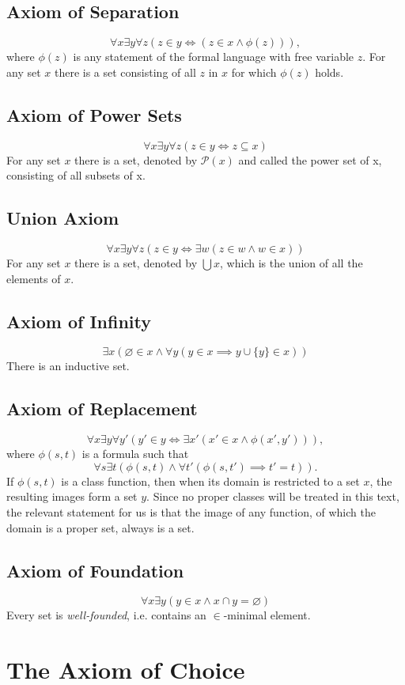 \documentclass[../../main.tex]{subfiles}
\begin{document}
\subsection{Axiom of Separation}
$$\forall x \exists y \forall z \left(z \in y \iff \left(z \in x \wedge \phi(z)\right)\right),$$
where $\phi(z)$ is any statement of the formal language with free variable $z$.
For any set $x$ there is a set consisting of all $z$ in $x$ for which $\phi(z)$ holds.

\subsection{Axiom of Power Sets}
$$\forall x \exists y \forall z \left(z \in y \iff z \subseteq x\right)$$
For any set $x$ there is a set, denoted by $\mathcal{P}(x)$ and called the power set of x, consisting of all subsets of x.

\subsection{Union Axiom}
$$\forall x \exists y \forall z \left(z \in y \iff \exists w \left(z \in w \wedge w \in x\right)\right)$$
For any set $x$ there is a set, denoted by $\bigcup x$, which is the union of all the elements of $x$.

\subsection{Axiom of Infinity} \label{ZF7}
$$\exists x \left(\varnothing \in x \wedge \forall y \left(y \in x \implies y \cup \{y\} \in x \right)\right)$$
There is an inductive set.

\subsection{Axiom of Replacement}
$$\forall x \exists y \forall y' \left(y' \in y \iff \exists x' \left(x' \in x \wedge \phi(x', y')\right)\right),$$
where $\phi(s, t)$ is a formula such that 
$$\forall s \exists t \left(\phi(s, t) \wedge \forall t' \left(\phi(s, t') \implies t' = t\right)\right).$$
If $\phi(s, t)$ is a class function, then when its domain is restricted to a set $x$, the resulting images form a set $y$.
Since no proper classes will be treated in this text, the relevant statement for us is that the image of any function, of which the domain is a proper set, always is a set.

\subsection{Axiom of Foundation}
$$\forall x \exists y \left(y \in x \wedge x \cap y = \varnothing \right)$$
Every set is \textit{well-founded}, i.e. contains an $\in$-minimal element.

\section{The Axiom of Choice}
\end{document}
